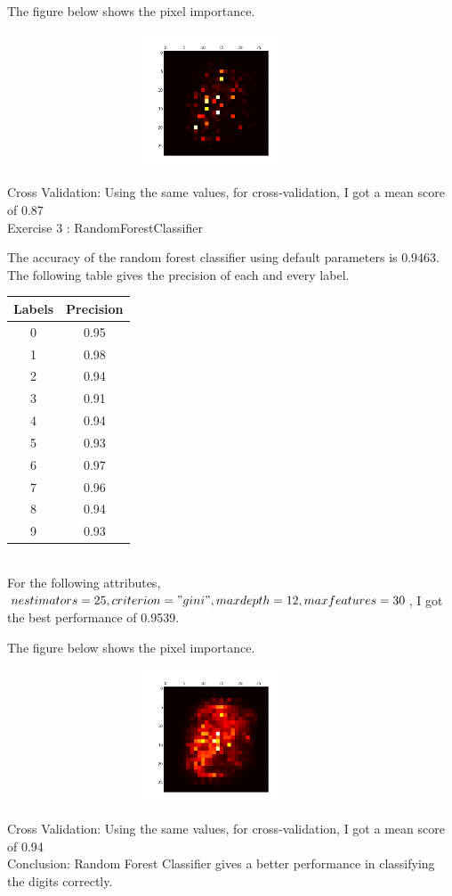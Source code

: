 \documentclass[12pt]{article}
\begin{document}
The figure below shows the pixel importance.

\begin{figure}[h]
\centering
\includegraphics[width=10cm, height=4cm]{5}
\end{figure}


Cross Validation: Using the same values, for cross-validation, I got a mean score of 0.87\\

Exercise 3 : RandomForestClassifier

The accuracy of the random forest classifier using default parameters is 0.9463. The following table gives the precision of each and every label.

\begin{tabular}{|c|c|}
\hline 
Labels & Precision \\ 
\hline 
0 & 0.95 \\ 
\hline 
1 & 0.98 \\ 
\hline 
2 & 0.94 \\ 
\hline 
3 & 0.91 \\ 
\hline 
4 & 0.94 \\ 
\hline 
5 & 0.93 \\ 
\hline 
6 & 0.97 \\ 
\hline 
7 & 0.96 \\ 
\hline 
8 & 0.94 \\ 
\hline 
9 & 0.93 \\ 
\hline 
\end{tabular} 
\\

For the following attributes, $n estimators =25 ,criterion ="gini",max depth =12,max features=30$, I got the best performance of 0.9539.

The figure below shows the pixel importance.

\begin{figure}[h]
\centering
\includegraphics[width=10cm, height=4cm]{6}
\end{figure}


Cross Validation: Using the same values, for cross-validation, I got a mean score of 0.94 \\

Conclusion: Random Forest Classifier gives a better performance in classifying the digits correctly.
\end{document}

